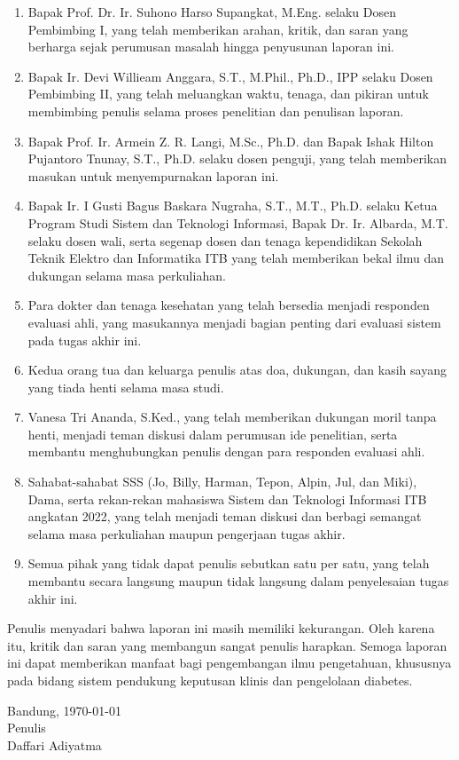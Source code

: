 \begin{enumerate}
    \item Bapak Prof. Dr. Ir. Suhono Harso Supangkat, M.Eng. selaku Dosen Pembimbing I, yang telah memberikan arahan, kritik, dan saran yang berharga sejak perumusan masalah hingga penyusunan laporan ini.
    \item Bapak Ir. Devi Willieam Anggara, S.T., M.Phil., Ph.D., IPP selaku Dosen Pembimbing II, yang telah meluangkan waktu, tenaga, dan pikiran untuk membimbing penulis selama proses penelitian dan penulisan laporan.
    \item Bapak Prof. Ir. Armein Z. R. Langi, M.Sc., Ph.D. dan Bapak Ishak Hilton Pujantoro Tnunay, S.T., Ph.D. selaku dosen penguji, yang telah memberikan masukan untuk menyempurnakan laporan ini.
    \item Bapak Ir. I Gusti Bagus Baskara Nugraha, S.T., M.T., Ph.D. selaku Ketua Program Studi Sistem dan Teknologi Informasi, Bapak Dr. Ir. Albarda, M.T. selaku dosen wali, serta segenap dosen dan tenaga kependidikan Sekolah Teknik Elektro dan Informatika ITB yang telah memberikan bekal ilmu dan dukungan selama masa perkuliahan.
    \item Para dokter dan tenaga kesehatan yang telah bersedia menjadi responden evaluasi ahli, yang masukannya menjadi bagian penting dari evaluasi sistem pada tugas akhir ini.
    \item Kedua orang tua dan keluarga penulis atas doa, dukungan, dan kasih sayang yang tiada henti selama masa studi.
    \item Vanesa Tri Ananda, S.Ked., yang telah memberikan dukungan moril tanpa henti, menjadi teman diskusi dalam perumusan ide penelitian, serta membantu menghubungkan penulis dengan para responden evaluasi ahli.
    \item Sahabat-sahabat SSS (Jo, Billy, Harman, Tepon, Alpin, Jul, dan Miki), Dama, serta rekan-rekan mahasiswa Sistem dan Teknologi Informasi ITB angkatan 2022, yang telah menjadi teman diskusi dan berbagi semangat selama masa perkuliahan maupun pengerjaan tugas akhir.
    \item Semua pihak yang tidak dapat penulis sebutkan satu per satu, yang telah membantu secara langsung maupun tidak langsung dalam penyelesaian tugas akhir ini.
\end{enumerate}

Penulis menyadari bahwa laporan ini masih memiliki kekurangan. Oleh karena itu, kritik dan saran yang membangun sangat penulis harapkan. Semoga laporan ini dapat memberikan manfaat bagi pengembangan ilmu pengetahuan, khususnya pada bidang sistem pendukung keputusan klinis dan pengelolaan diabetes.
\begin{flushright}
    Bandung, \today\\

    Penulis \\
    \vspace{1cm}
    Daffari Adiyatma
\end{flushright}
